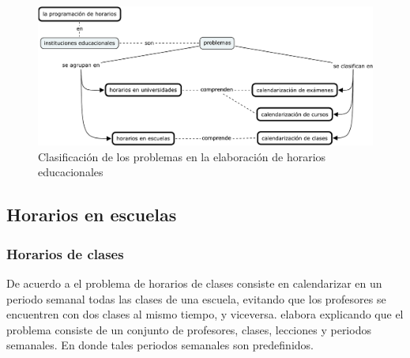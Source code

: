 \documentclass[draft,12pt,headsepline,footsepline,paper=letter]{scrreprt}
\begin{document}
\begin{figure}[hbtp]
\centering
\includegraphics[width=\textwidth]{timetabling_classification.pdf}
\caption[Clasificación del problema]{Clasificación de los problemas en la elaboración de horarios educacionales}
\label{fig:timetabling_classification}
\end{figure}

\subsection{Horarios en escuelas}


\subsubsection{Horarios de clases}

De acuerdo a \citet[p.~88]{schaerf99a-survey-of-automated} el problema de horarios de clases consiste en calendarizar en un periodo semanal todas las clases de una escuela, evitando que los profesores se encuentren con dos clases al mismo tiempo, y viceversa. \citet[p.~10,11]{abdullah06heuristic-approaches} elabora explicando que el problema consiste de un conjunto de profesores, clases, lecciones y periodos semanales. En donde tales periodos semanales son predefinidos.
\end{document}
